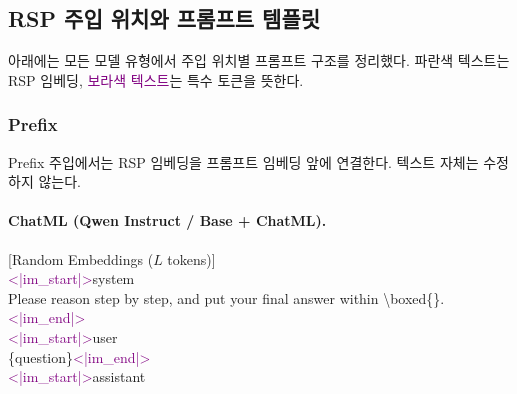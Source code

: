 \subsection{RSP 주입 위치와 프롬프트 템플릿}\label{app:injection_positions}

아래에는 모든 모델 유형에서 주입 위치별 프롬프트 구조를 정리했다. \textcolor{blue!70!black}{파란색 텍스트}는 RSP 임베딩, \textcolor{purple}{보라색 텍스트}는 특수 토큰을 뜻한다.

\subsubsection{Prefix}

Prefix 주입에서는 RSP 임베딩을 프롬프트 임베딩 앞에 연결한다. 텍스트 자체는 수정하지 않는다.

\paragraph{ChatML (Qwen Instruct / Base + ChatML).}
\begin{tcolorbox}[colback=gray!5, colframe=black!60, arc=3pt, boxrule=0.5pt, fontupper=\footnotesize\ttfamily, breakable]
\textcolor{blue!70!black}{[Random Embeddings ($L$ tokens)]}\\
\textcolor{purple}{<|im\_start|>}system\\
Please reason step by step, and put your final answer within \textbackslash boxed\{\}.\textcolor{purple}{<|im\_end|>}\\
\textcolor{purple}{<|im\_start|>}user\\
\{question\}\textcolor{purple}{<|im\_end|>}\\
\textcolor{purple}{<|im\_start|>}assistant
\end{tcolorbox}

